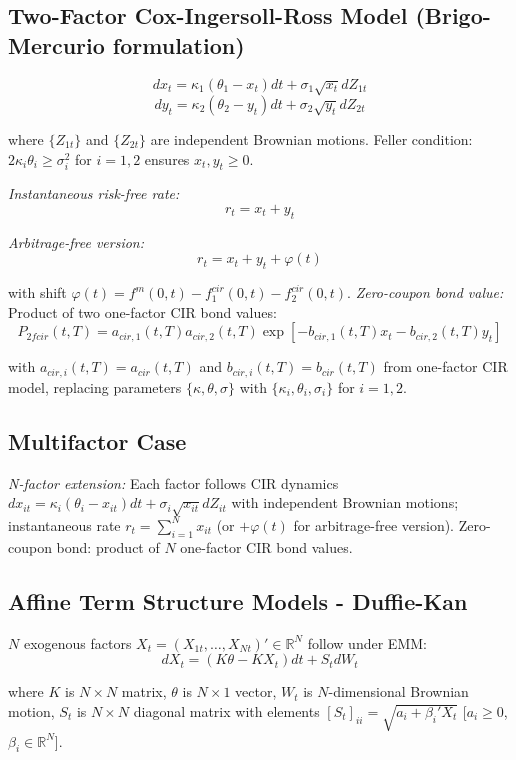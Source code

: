\documentclass[12pt,a4paper]{article}
\begin{document}
\subsection{Two-Factor Cox-Ingersoll-Ross Model (Brigo-Mercurio formulation)}
$$dx_t = \kappa_1(\theta_1 - x_t)dt + \sigma_1\sqrt{x_t}dZ_{1t}$$
$$dy_t = \kappa_2(\theta_2 - y_t)dt + \sigma_2\sqrt{y_t}dZ_{2t}$$

where $\{Z_{1t}\}$ and $\{Z_{2t}\}$ are independent Brownian motions. Feller condition: $2\kappa_i\theta_i \geq \sigma_i^2$ for $i = 1,2$ ensures $x_t, y_t \geq 0$.

\textit{Instantaneous risk-free rate:}
$$r_t = x_t + y_t$$

\textit{Arbitrage-free version:}
$$r_t = x_t + y_t + \varphi(t)$$

with shift $\varphi(t) = f^m(0,t) - f^{cir}_1(0,t) -f^{cir}_2(0,t)$.
\textit{Zero-coupon bond value:} Product of two one-factor CIR bond values:
$$P_{2fcir}(t,T) = a_{cir,1}(t,T)a_{cir,2}(t,T)\exp[-b_{cir,1}(t,T)x_t - b_{cir,2}(t,T)y_t]$$

with $a_{cir,i}(t,T) = a_{cir}(t,T)$ and $b_{cir,i}(t,T) = b_{cir}(t,T)$ from one-factor CIR model, replacing parameters $\{\kappa, \theta, \sigma\}$ with $\{\kappa_i, \theta_i, \sigma_i\}$ for $i = 1,2$.

\subsection{Multifactor Case}

\textit{N-factor extension:} Each factor follows CIR dynamics $dx_{it} = \kappa_i(\theta_i - x_{it})dt + \sigma_i\sqrt{x_{it}}dZ_{it}$ with independent Brownian motions; instantaneous rate $r_t = \sum_{i=1}^N x_{it}$ (or $+ \varphi(t)$ for arbitrage-free version). Zero-coupon bond: product of $N$ one-factor CIR bond values.

\subsection{Affine Term Structure Models - Duffie-Kan}

$N$ exogenous factors $X_t = (X_{1t}, \ldots, X_{Nt})' \in \mathbb{R}^N$ follow under EMM:
$$dX_t = (K\theta - KX_t)dt + S_t dW_t$$

where $K$ is $N \times N$ matrix, $\theta$ is $N \times 1$ vector, $W_t$ is $N$-dimensional Brownian motion, $S_t$ is $N \times N$ diagonal matrix with elements $[S_t]_{ii} = \sqrt{a_i + \beta_i' X_t}$ [$a_i \geq 0$, $\beta_i \in \mathbb{R}^N$].
\end{document}
